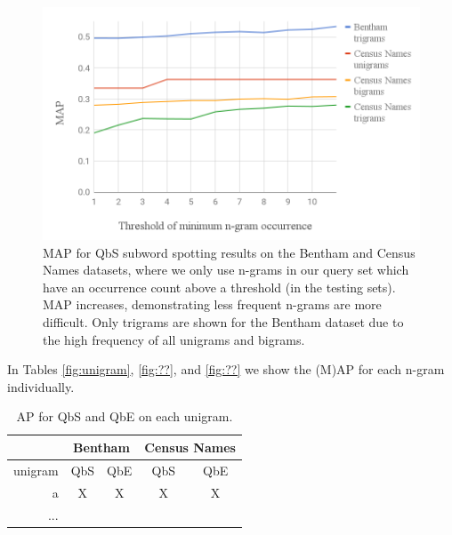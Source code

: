 \documentclass[ms,electronic,twosidetoc,letterpaper,chaptercenter,parttop,lol,lof,lot]{byumsphd}
\begin{document}
\begin{figure}
    \centering
    \includegraphics[width=.75\textwidth]{removengrams}
    \caption{MAP for QbS subword spotting results on the Bentham and Census Names datasets, where we only use n-grams in our query set which have an occurrence count above a threshold (in the testing sets). MAP increases, demonstrating less frequent n-grams are more difficult. Only trigrams are shown for the Bentham dataset due to the high frequency of all unigrams and bigrams.}
    \label{fig:remove}
\end{figure}

In Tables \ref{fig:unigram}, \ref{fig:??}, and \ref{fig:??} we show the (M)AP for each n-gram individually. 
\begin{table}
\centering
\begin{tabular}{| r | c c | c c |}
  \hline
  & \multicolumn{2}{c|}{Bentham} & \multicolumn{2}{c|}{Census Names}\\
  \hline
  unigram & QbS & QbE & QbS & QbE\\
  \hline 
  a & X & X  &   X & X\\
  ...\\
  \hline 
\end{tabular}
\caption{AP for QbS and QbE on each unigram.}
\label{tab:unigram}
\end{table}

\end{document}
